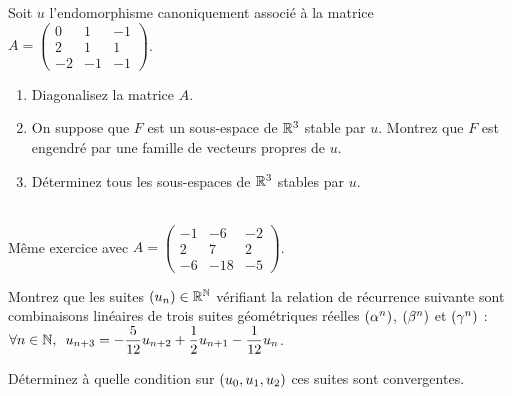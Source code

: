 \begin{corr}
\end{corr}

\begin{exoss}[Exercice 15]
Soit \(u\) l'endomorphisme canoniquement associé à la matrice \(A=\begin{pmatrix}
0 & 1 & -1 \\
2 & 1 & 1 \\
-2 & -1 & -1
\end{pmatrix}\).

\begin{enumerate}
    \item Diagonalisez la matrice \(A\). \\
    \item On suppose que \(F\) est un sous-espace de \(\mathbb{R}^3\) stable par \(u\). Montrez que \(F\) est engendré par une famille de vecteurs propres de \(u\). \\
    \item Déterminez tous les sous-espaces de \(\mathbb{R}^3\) stables par \(u\).
\end{enumerate}
\end{exoss}

\begin{corr}
\end{corr}

\begin{exos}[Exercice 16]~\\
Même exercice avec \(A=\begin{pmatrix}
-1 & -6 & -2 \\
2 & 7 & 2 \\
-6 & -18 & -5
\end{pmatrix}\).
\end{exos}

\begin{corr}
\end{corr}

\begin{exos}[Exercice 17]
Montrez que les suites \(\left(u_n\right)\in\mathbb{R}^{\mathbb{N}}\) vérifiant la relation de récurrence suivante sont combinaisons linéaires de trois suites géométriques réelles \(\left(\alpha^n\right)\), \(\left(\beta^n\right)\) et \(\left(\gamma^n\right)\) : \(\quantifs{\forall n\in\N}u_{n+3}=-\dfrac{5}{12}u_{n+2}+\dfrac{1}{2}u_{n+1}-\dfrac{1}{12}u_n\).

Déterminez à quelle condition sur \(\left(u_0,u_1,u_2\right)\) ces suites sont convergentes.
\end{exos}

